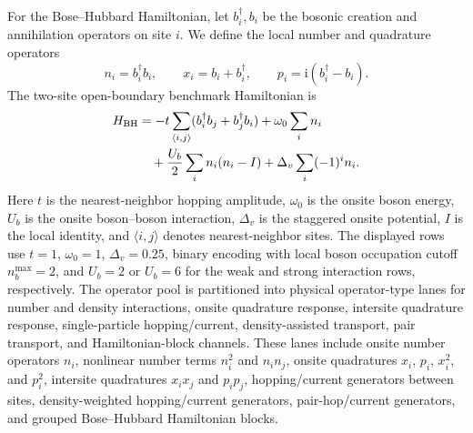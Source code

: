 \documentclass[
  reprint,
  amsmath,
  amssymb,
  aps,
  pra,
  nofootinbib,
  superscriptaddress,
  floatfix
]{revtex4-2}
\newcommand{\ii}{\mathrm{i}}
\begin{document}
For the Bose--Hubbard Hamiltonian, let \(b_i^\dagger,b_i\) be the bosonic
creation and annihilation operators on site \(i\). We define the local number
and quadrature operators
\[
n_i=b_i^\dagger b_i,\qquad
x_i=b_i+b_i^\dagger,\qquad
p_i=\ii(b_i^\dagger-b_i).
\]
The two-site open-boundary benchmark Hamiltonian is
\begin{equation*}
\begin{aligned}
H_{\rm BH}
&=-t\sum_{\langle i,j\rangle}
(b_i^\dagger b_j+b_j^\dagger b_i)
+\omega_0\sum_i n_i\\
&\quad+\frac{U_b}{2}\sum_i n_i(n_i-I)
+\Delta_v\sum_i(-1)^i n_i .
\end{aligned}
\end{equation*}
Here \(t\) is the nearest-neighbor hopping amplitude, \(\omega_0\) is the
onsite boson energy, \(U_b\) is the onsite boson--boson interaction,
\(\Delta_v\) is the staggered onsite potential, \(I\) is the local identity,
and \(\langle i,j\rangle\) denotes nearest-neighbor sites. The displayed rows
use \(t=1\), \(\omega_0=1\), \(\Delta_v=0.25\), binary encoding with local
boson occupation cutoff \(n_b^{\max}=2\), and \(U_b=2\) or \(U_b=6\) for the
weak and strong interaction rows, respectively.
The operator pool is partitioned into physical operator-type lanes for number
and density interactions, onsite quadrature response, intersite quadrature
response, single-particle hopping/current, density-assisted transport, pair
transport, and Hamiltonian-block channels. These lanes include onsite number
operators \(n_i\), nonlinear number terms \(n_i^2\) and \(n_in_j\), onsite
quadratures \(x_i\), \(p_i\), \(x_i^2\), and \(p_i^2\), intersite quadratures
\(x_ix_j\) and \(p_ip_j\), hopping/current generators between sites,
density-weighted hopping/current generators, pair-hop/current generators, and
grouped Bose--Hubbard Hamiltonian blocks.
\end{document}

